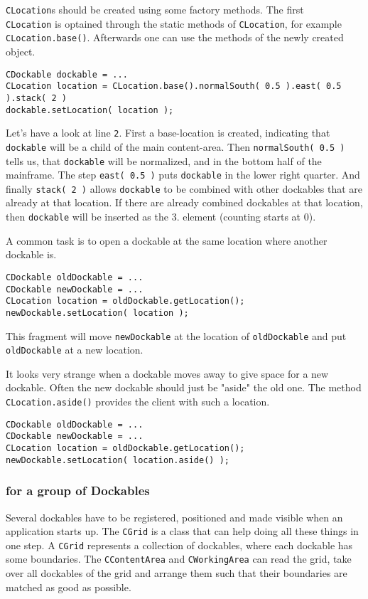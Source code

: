 \documentclass[a4paper,10pt]{article}
\newcommand{\src}[1]{\lstinline[basicstyle=\ttfamily]|#1|}
\begin{document}
\src{CLocation}s should be created using some factory methods. The first \\\src{CLocation} is optained through the static methods of \src{CLocation}, for example \src{CLocation.base()}. Afterwards one can use the methods of the newly created object.
\begin{lstlisting}
CDockable dockable = ...
CLocation location = CLocation.base().normalSouth( 0.5 ).east( 0.5 ).stack( 2 )
dockable.setLocation( location );
\end{lstlisting}
Let's have a look at line \src{2}. First a base-location is created, indicating that \src{dockable} will be a child of the main content-area. Then \src{normalSouth( 0.5 )} tells us, that \src{dockable} will be normalized, and in the bottom half of the mainframe. The step \src{east( 0.5 )} puts \src{dockable} in the lower right quarter. And finally \src{stack( 2 )} allows \src{dockable} to be combined with other dockables that are already at that location. If there are already combined dockables at that location, then \src{dockable} will be inserted as the 3. element (counting starts at 0).

A common task is to open a dockable at the same location where another dockable is.
\begin{lstlisting}
CDockable oldDockable = ...
CDockable newDockable = ...
CLocation location = oldDockable.getLocation();
newDockable.setLocation( location );
\end{lstlisting}
This fragment will move \src{newDockable} at the location of \src{oldDockable} and put \src{oldDockable} at a new location.

It looks very strange when a dockable moves away to give space for a new dockable. Often the new dockable should just be "aside" the old one. The method \src{CLocation.aside()} provides the client with such a location.
\begin{lstlisting}
CDockable oldDockable = ...
CDockable newDockable = ...
CLocation location = oldDockable.getLocation();
newDockable.setLocation( location.aside() );
\end{lstlisting}

\subsubsection{for a group of Dockables}
Several dockables have to be registered, positioned and made visible when an application starts up. The \src{CGrid} is a class that can help doing all these things in one step. A \src{CGrid} represents a collection of dockables, where each dockable has some boundaries. The \src{CContentArea} and \src{CWorkingArea} can read the grid, take over all dockables of the grid and arrange them such that their boundaries are matched as good as possible.
\end{document}
